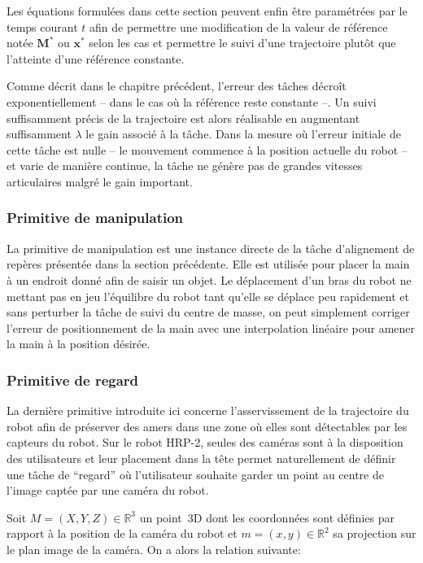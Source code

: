 Les équations formulées dans cette section peuvent enfin être
paramétrées par le temps courant $t$ afin de permettre une
modification de la valeur de référence notée $\mathbf{M}^*$ ou
$\mathbf{x}^*$ selon les cas et permettre le suivi d'une trajectoire
plutôt que l'atteinte d'une référence constante.


Comme décrit dans le chapitre précédent, l'erreur des tâches décroît
exponentiellement -- dans le cas où la référence reste constante
--. Un suivi suffisamment précis de la trajectoire est alors
réalisable en augmentant suffisamment $\lambda$ le gain associé à la
tâche. Dans la mesure où l'erreur initiale de cette tâche est nulle --
le mouvement commence à la position actuelle du robot -- et varie de
manière continue, la tâche ne génère pas de grandes vitesses
articulaires malgré le gain important.


\subsubsection{Primitive de manipulation}


La primitive de manipulation est une instance directe de la tâche
d'alignement de repères présentée dans la section précédente. Elle
est utilisée pour placer la main à un endroit donné afin de saisir un
objet. Le déplacement d'un bras du robot ne mettant pas en jeu
l'équilibre du robot tant qu'elle se déplace peu rapidement et sans
perturber la tâche de suivi du centre de masse, on peut simplement
corriger l'erreur de positionnement de la main avec une interpolation
linéaire pour amener la main à la position désirée.


\subsubsection{Primitive de regard}


La dernière primitive introduite ici concerne l'asservissement de la
trajectoire du robot afin de préserver des amers dans une zone où
elles sont détectables par les capteurs du robot. Sur le robot HRP-2,
seules des caméras sont à la disposition des utilisateurs et leur
placement dans la tête permet naturellement de définir une tâche de
``regard'' où l'utilisateur souhaite garder un point au centre de
l'image captée par une caméra du robot.

Soit \mbox{$M = (X, Y, Z) \in \mathbb{R}^3$} un point 3D dont les
coordonnées sont définies par rapport à la position de la caméra du
robot et \mbox{$m = (x, y) \in \mathbb{R}^2$} sa projection sur le
plan image de la caméra. On a alors la
relation suivante:

